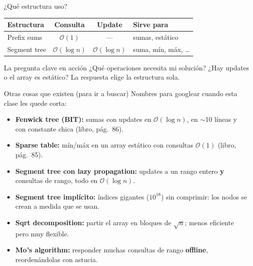 \documentclass{beamer}
\begin{document}
\begin{frame}{¿Qué estructura uso?}
    \begin{table}
        \centering
        \begin{tabular}{|l|c|c|l|}
            \hline
            \textbf{Estructura} & \textbf{Consulta} & \textbf{Update} & \textbf{Sirve para} \\
            \hline
            Prefix sums & $\mathcal{O}(1)$ & --- & sumas, estático \\
            Segment tree & $\mathcal{O}(\log n)$ & $\mathcal{O}(\log n)$ & suma, mín, máx, \ldots \\
            \hline
        \end{tabular}
    \end{table}

    \vspace{0.2cm}
    \begin{alertblock}{La pregunta clave en acción}
        ¿Qué operaciones necesita mi solución? ¿Hay updates o el array es
        estático? La respuesta elige la estructura sola.
    \end{alertblock}
\end{frame}


\begin{frame}{Otras cosas que existen (para ir a buscar)}
    Nombres para googlear cuando esta clase les quede corta:
    \begin{itemize}
        \item \textbf{Fenwick tree (BIT):} sumas con updates en
              $\mathcal{O}(\log n)$, en $\sim$10 líneas y con constante
              chica (libro, pág.~86).
        \item \textbf{Sparse table:} mín/máx en un array estático con
              consultas $\mathcal{O}(1)$ (libro, pág.~85).
        \item \textbf{Segment tree con lazy propagation:} updates a un rango
              entero \textbf{y} consultas de rango, todo en $\mathcal{O}(\log n)$.
        \item \textbf{Segment tree implícito:} índices gigantes ($10^{18}$)
              sin comprimir: los nodos se crean a medida que se usan.
        \item \textbf{Sqrt decomposition:} partir el array en bloques de
              $\sqrt{n}$; menos eficiente pero muy flexible.
        \item \textbf{Mo's algorithm:} responder muchas consultas de rango
              \textbf{offline}, reordenándolas con astucia.
    \end{itemize}
\end{frame}
\end{document}
